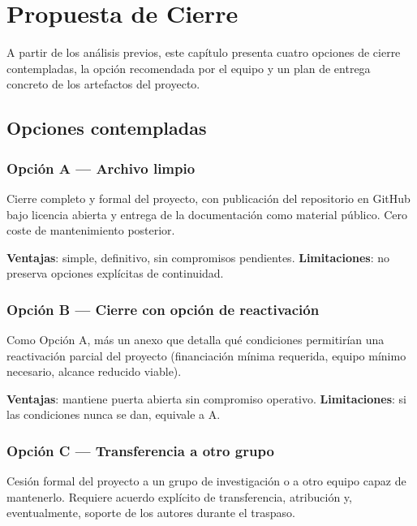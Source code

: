 \chapter{Propuesta de Cierre}
\label{cap:propuesta}

A partir de los an\'alisis previos, este cap\'itulo presenta cuatro
opciones de cierre contempladas, la opci\'on recomendada por el equipo
y un plan de entrega concreto de los artefactos del proyecto.

\section{Opciones contempladas}

\subsection*{Opci\'on A --- Archivo limpio}

Cierre completo y formal del proyecto, con publicaci\'on del repositorio
en GitHub bajo licencia abierta y entrega de la documentaci\'on como
material p\'ublico. Cero coste de mantenimiento posterior.

\textbf{Ventajas}: simple, definitivo, sin compromisos pendientes.
\textbf{Limitaciones}: no preserva opciones expl\'icitas de continuidad.

\subsection*{Opci\'on B --- Cierre con opci\'on de reactivaci\'on}

Como Opci\'on A, m\'as un anexo que detalla qu\'e condiciones
permitir\'ian una reactivaci\'on parcial del proyecto (financiaci\'on
m\'inima requerida, equipo m\'inimo necesario, alcance reducido viable).

\textbf{Ventajas}: mantiene puerta abierta sin compromiso operativo.
\textbf{Limitaciones}: si las condiciones nunca se dan, equivale a A.

\subsection*{Opci\'on C --- Transferencia a otro grupo}

Cesi\'on formal del proyecto a un grupo de investigaci\'on o a otro
equipo capaz de mantenerlo. Requiere acuerdo expl\'icito de
transferencia, atribuci\'on y, eventualmente, soporte de los autores
durante el traspaso.

